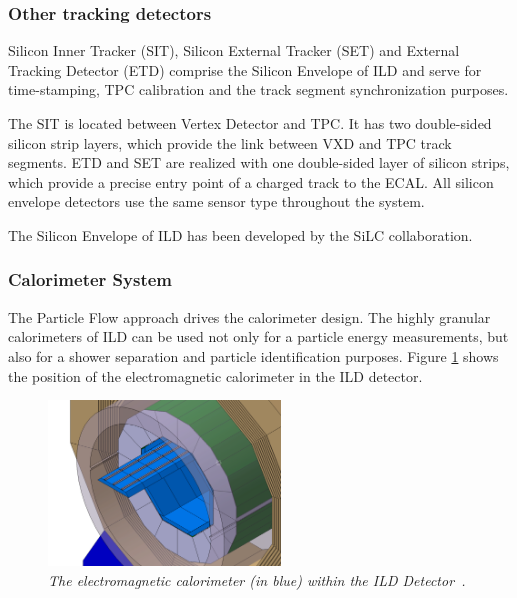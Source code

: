 \subsubsection{Other tracking detectors}
Silicon Inner Tracker (SIT), Silicon External Tracker (SET) and External Tracking Detector (ETD) comprise the Silicon Envelope of ILD and serve for time-stamping, TPC calibration and the track segment synchronization purposes. 


The SIT is located between Vertex Detector and TPC. It has two double-sided silicon strip layers, which provide the link between VXD and TPC track segments. ETD and SET are realized with one double-sided layer of silicon strips, which provide a precise entry point of a charged track to the ECAL. All silicon envelope detectors use the same sensor type throughout the system.

The Silicon Envelope of ILD has been developed by the SiLC collaboration.

\subsubsection{Calorimeter System}

The Particle Flow approach drives the calorimeter design. The highly granular calorimeters of ILD can be used not only for a particle energy measurements, but also for a shower separation and particle identification purposes. 
Figure \ref{fig:ILCecal} shows the position of the electromagnetic calorimeter in the ILD detector.

\begin{figure}
	{\centering
		\includegraphics[width=0.55\textwidth]{graphics/ild-cal.png}
		\caption{\sl The electromagnetic calorimeter (in blue) within the ILD Detector~\cite{bib:ILC}.}
		\label{fig:ILCecal}
	}
\end{figure}

